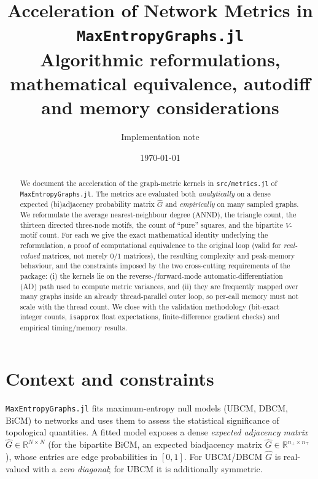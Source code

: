 \documentclass[11pt]{article}
\title{\textbf{Acceleration of Network Metrics in \texttt{MaxEntropyGraphs.jl}}\\[2pt]
\large Algorithmic reformulations, mathematical equivalence, autodiff and memory considerations}
\author{Implementation note}
\date{\today}
\theoremstyle{plain}
\theoremstyle{definition}
\newcommand{\R}{\mathbb{R}}
\newcommand{\Ghat}{\hat{G}}
\begin{document}
\maketitle

\begin{abstract}
We document the acceleration of the graph-metric kernels in \texttt{src/metrics.jl} of
\texttt{MaxEntropyGraphs.jl}. The metrics are evaluated both \emph{analytically} on a dense expected
(bi)adjacency probability matrix $\Ghat$ and \emph{empirically} on many sampled graphs. We reformulate the
average nearest-neighbour degree (ANND), the triangle count, the thirteen directed three-node motifs, the
count of ``pure'' squares, and the bipartite $V$-motif count. For each we give the exact mathematical
identity underlying the reformulation, a proof of computational equivalence to the original loop
(valid for \emph{real-valued} matrices, not merely $0/1$ matrices), the resulting complexity and
peak-memory behaviour, and the constraints imposed by the two cross-cutting requirements of the package:
(i) the kernels lie on the reverse-/forward-mode automatic-differentiation (AD) path used to compute metric
variances, and (ii) they are frequently mapped over many graphs inside an already thread-parallel outer
loop, so per-call memory must not scale with the thread count. We close with the validation methodology
(bit-exact integer counts, \texttt{isapprox} float expectations, finite-difference gradient checks) and
empirical timing/memory results.
\end{abstract}

\tableofcontents

\section{Context and constraints}
\label{sec:context}

\texttt{MaxEntropyGraphs.jl} fits maximum-entropy null models (UBCM, DBCM, BiCM) to networks and uses them
to assess the statistical significance of topological quantities. A fitted model exposes a dense
\emph{expected adjacency matrix} $\Ghat\in\R^{N\times N}$ (for the bipartite BiCM, an expected biadjacency
matrix $\Ghat\in\R^{n_\perp\times n_\top}$), whose entries are edge probabilities in $[0,1]$. For UBCM/DBCM
$\Ghat$ is real-valued with a \emph{zero diagonal}; for UBCM it is additionally symmetric.
\end{document}
